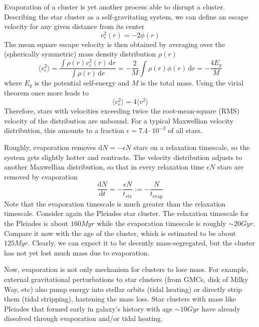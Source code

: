 Evaporation of a cluster is yet another process able to disrupt a cluster. Describing the star cluster as a self-gravitating system, we can define an escape velocity for any given distance from its center 
\begin{equation*}
    v^{2}_{e}(r) = -2\phi(r)
\end{equation*}
The mean square escape velocity is then obtained by averaging over the (spherically symmetric) mass density distribution $\rho(r)$
\begin{equation*}
    \langle v^{2}_{e}\rangle = \frac{\int \rho(r)v^{2}_{e}(r)\,\text{d}r}{\int \rho(r)\,\text{d}r} = -\frac{2}{M}\int \rho(r)\phi(r)\,\text{d}r = -\frac{4E_{g}}{M}
\end{equation*}
where $E_{g}$ is the potential self-energy and $M$ is the total mass. Using the virial theorem once more leads to 
\begin{equation*}
    \langle v^{2}_{e}\rangle = 4\langle v^{2}\rangle
\end{equation*}
Therefore, stars with velocities exceeding twice the root-mean-square (RMS) velocity of the distribution are unbound. For a typical Maxwellian velocity distribution, this amounts to a fraction $\epsilon = 7.4\cdot 10^{-3}$ of all stars.
\par Roughly, evaporation removes $\text{d}N = -\epsilon N$ stars on a relaxation timescale, so the system gets slightly hotter and contracts. The velocity distribution adjusts to another Maxwellian distribution, so that in every relaxation time $\epsilon N$ stars are removed by evaporation
\begin{equation}
    \frac{\text{d}N}{\text{d}t} = -\frac{\epsilon N}{t_{rlx}} := -\frac{N}{t_{\text{evap}}}
    \label{eq:evaporation_ts}
\end{equation}
Note that the evaporation timescale is much greater than the relaxation timescale. Consider again the Pleiades star cluster. The relaxation timescale for the Pleiades is about $160\unit{Myr}$ while the evaporation timescale is roughly $\sim 20\unit{Gyr}$. Compare it now with the age of the cluster, which is estimated to be about $125 \unit{Myr}$. Clearly, we can expect it to be decently mass-segregated, but the cluster has not yet lost much mass due to evaporation.
\par Now, evaporation is not only mechanism for clusters to lose mass. For example, external gravitational perturbations to star clusters (from GMCs, disk of Milky Way, etc) also pump energy into stellar orbits (tidal heating) or directly strip them (tidal stripping), hastening the mass loss. Star clusters with mass like Pleiades that formed early in galaxy's history with age $\sim 10\unit{Gyr}$ have already dissolved through evaporation and/or tidal heating.
